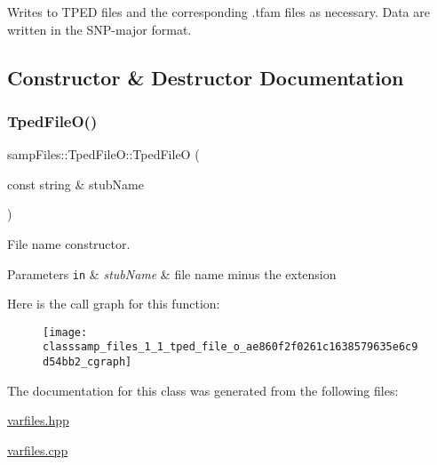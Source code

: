 Writes to T\+P\+ED files and the corresponding .tfam files as necessary. Data are written in the S\+N\+P-\/major format. 

\subsection{Constructor \& Destructor Documentation}
\mbox{\label{classsamp_files_1_1_tped_file_o_ae860f2f0261c1638579635e6c9d54bb2}} 
\subsubsection{\texorpdfstring{Tped\+File\+O()}{TpedFileO()}}
{\footnotesize\ttfamily samp\+Files\+::\+Tped\+File\+O\+::\+Tped\+FileO (\begin{DoxyParamCaption}\item[{const string \&}]{stub\+Name }\end{DoxyParamCaption})\hspace{0.3cm}{\ttfamily [inline]}}



File name constructor. 


\begin{DoxyParams}[1]{Parameters}
\mbox{\tt in}  & {\em stub\+Name} & file name minus the extension \\
\hline
\end{DoxyParams}
Here is the call graph for this function\+:\nopagebreak
\begin{figure}[H]
\begin{center}
\leavevmode
\texttt{[image: classsamp\_files\_1\_1\_tped\_file\_o\_ae860f2f0261c1638579635e6c9d54bb2\_cgraph]}
\end{center}
\end{figure}


The documentation for this class was generated from the following files\+:\begin{DoxyCompactItemize}
\item 
\hyperlink{varfiles_8hpp}{varfiles.\+hpp}\item 
\hyperlink{varfiles_8cpp}{varfiles.\+cpp}\end{DoxyCompactItemize}
